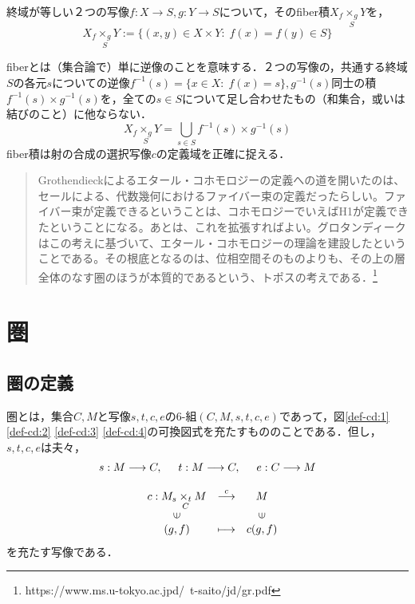 \documentclass[uplatex, 12pt, a4paper, dvipdfmx]{jsarticle}
\begin{document}
\begin{shadebox}\begin{definition}[fiber積]終域が等しい２つの写像$f:X\longrightarrow S, g:Y\longrightarrow S$について，その\rm{fiber積}$X_f\underset{S}{\times_g}Y$を，$$X_f\underset{S}{\times_g}Y:=\{ (x,y)\in X\times Y:\; f(x)=f(y)\in S \}$$  \end{definition}\end{shadebox}
fiberとは（集合論で）単に逆像のことを意味する．２つの写像の，共通する終域$S$の各元$s$についての逆像$f^{-1}(s)=\{ x\in X:\; f(x)=s \},g^{-1}(s)$同士の積$f^{-1}(s)\times g^{-1}(s)$を，全ての$s\in S$について足し合わせたもの（和集合，或いは結びのこと）に他ならない．$$X_f\underset{S}{\times_g}Y=\bigcup_{s\in S}f^{-1}(s)\times g^{-1}(s)$$
fiber積は射の合成の選択写像$c$の定義域を正確に捉える．

\begin{quote}
    Grothendieckによるエタール・コホモロジーの定義への道を開いたのは、セールによる、代数幾何におけるファイバー束の定義だったらしい。ファイバー束が定義できるということは、コホモロジーでいえばH1が定義できたということになる。あとは、これを拡張すればよい。グロタンディークはこの考えに基づいて、エタール・コホモロジーの理論を建設したということである。その根底となるのは、位相空間そのものよりも、その上の層全体のなす圏のほうが本質的であるという、トポスの考えである．\footnote{https://www.ms.u-tokyo.ac.jpd/~t-saito/jd/gr.pdf}
\end{quote}

\clearpage


\section{圏}
\subsection{圏の定義}
\begin{shadebox}\begin{definition}[圏]圏とは，集合$C,M$と写像$s,t,c,e$の6-組$(C,M,s,t,c,e)$であって，図\ref{def-cd:1} \ref{def-cd:2} \ref{def-cd:3} \ref{def-cd:4}の可換図式を充たすもののことである．但し，$s,t,c,e$は夫々，\begin{eqnarray*}s:M\longrightarrow C,\hspace{5mm} t:M\longrightarrow C, \hspace{5mm} e:C\longrightarrow M\\[3mm] \left. 
\begin{array}{ccc}
    c:M_s\underset{C}{\times_t}M & \stackrel{c}{\longrightarrow} & M \\
    \rotatebox{90}{$\in$} & & \rotatebox{90}{$\in$} \\
    (g,f) & \longmapsto & c(g,f)
\end{array} \right. \hspace{10mm} \end{eqnarray*}を充たす写像である．

\vspace{1mm} \end{definition}\end{shadebox}
\end{document}
